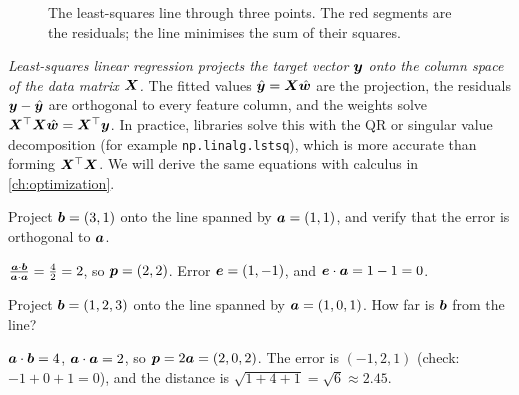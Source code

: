 \begin{figure}[htbp]
\centering
{}
\caption{The least-squares line through three points. The red segments are the
  residuals; the line minimises the sum of their squares.}
\label{fig:least-squares}
\end{figure}

\begin{mlnote}
\emph{Least-squares linear regression projects the target vector $\bm{y}$ onto the
column space of the data matrix $\bm{X}$.} The fitted values $\hat{\bm{y}} = \bm{X}\hat{\bm{w}}$
are the projection, the residuals $\bm{y} - \hat{\bm{y}}$ are orthogonal to every
feature column, and the weights solve $\bm{X}^\top\bm{X}\hat{\bm{w}} = \bm{X}^\top\bm{y}$. In
practice, libraries solve this with the QR or singular value decomposition
(for example \texttt{np.linalg.lstsq}), which is more accurate than forming
$\bm{X}^\top\bm{X}$. We will derive the same equations with calculus in
\cref{ch:optimization}.
\end{mlnote}

\sectionexercises

\begin{exercise}
Project $\bm{b} = (3, 1)$ onto the line spanned by $\bm{a} = (1, 1)$, and verify
that the error is orthogonal to $\bm{a}$.
\end{exercise}
\begin{solution}
$\tfrac{\bm{a}\cdot\bm{b}}{\bm{a}\cdot\bm{a}} = \tfrac42 = 2$, so $\bm{p} = (2, 2)$. Error
$\bm{e} = (1, -1)$, and $\bm{e}\cdot\bm{a} = 1 - 1 = 0$.
\end{solution}

\begin{exercise}
Project $\bm{b} = (1, 2, 3)$ onto the line spanned by $\bm{a} = (1, 0, 1)$. How far is
$\bm{b}$ from the line?
\end{exercise}
\begin{solution}
$\bm{a}\cdot\bm{b} = 4$, $\bm{a}\cdot\bm{a} = 2$, so $\bm{p} = 2\bm{a} = (2, 0, 2)$. The error is
$(-1, 2, 1)$ (check: $-1 + 0 + 1 = 0$), and the distance is
$\sqrt{1 + 4 + 1} = \sqrt6 \approx 2.45$.
\end{solution}


